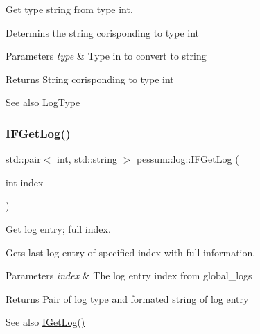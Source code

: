 Get type string from type int. 

Determins the string corisponding to type int 
\begin{DoxyParams}{Parameters}
{\em type} & Type in to convert to string \\
\hline
\end{DoxyParams}
\begin{DoxyReturn}{Returns}
String corisponding to type int 
\end{DoxyReturn}
\begin{DoxySeeAlso}{See also}
\hyperlink{namespacepessum_1_1log_a67fb11f9f43693f8926c9cfaa70ecd55}{Log\+Type} 
\end{DoxySeeAlso}
\mbox{\label{namespacepessum_1_1log_a27f5149706f331d518d1e6a1867c9d8d}} 
\subsubsection{\texorpdfstring{I\+F\+Get\+Log()}{IFGetLog()}}
{\footnotesize\ttfamily std\+::pair$<$ int, std\+::string $>$ pessum\+::log\+::\+I\+F\+Get\+Log (\begin{DoxyParamCaption}\item[{int}]{index }\end{DoxyParamCaption})}



Get log entry; full index. 

Gets last log entry of specified index with full information. 
\begin{DoxyParams}{Parameters}
{\em index} & The log entry index from global\+\_\+logs \\
\hline
\end{DoxyParams}
\begin{DoxyReturn}{Returns}
Pair of log type and formated string of log entry 
\end{DoxyReturn}
\begin{DoxySeeAlso}{See also}
\hyperlink{namespacepessum_1_1log_a4b198279b4ed44ed0a58995ac1a03c96}{I\+Get\+Log()} 
\end{DoxySeeAlso}
\mbox{\label{namespacepessum_1_1log_a4b198279b4ed44ed0a58995ac1a03c96}} 

